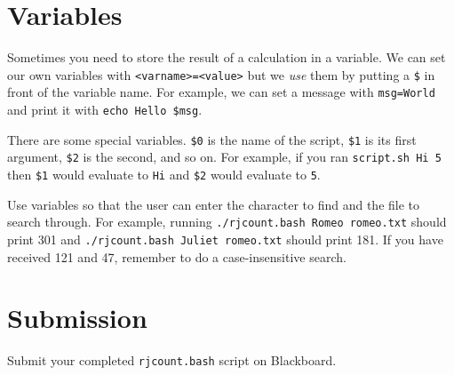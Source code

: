\documentclass[12pt]{article}
\newcommand{\code}[1]{\texttt{#1}}
\newcommand{\filename}{\code{rjcount.bash}\xspace}
\begin{document}
\section*{Variables}

Sometimes you need to store the result of a calculation in a variable.
We can set our own variables with \code{<varname>=<value>} but we \emph{use} them by putting a \code{\$} in front of the variable name.
For example, we can set a message with \code{msg=World} and print it with \code{echo Hello \$msg}.

There are some special variables.
\code{\$0} is the name of the script, \code{\$1} is its first argument, \code{\$2} is the second, and so on.
For example, if you ran \code{script.sh Hi 5} then \code{\$1} would evaluate to \code{Hi} and \code{\$2} would evaluate to \code{5}.

Use variables so that the user can enter the character to find and the file to search through.
For example, running \code{./\filename Romeo romeo.txt} should print 301 and \code{./\filename Juliet romeo.txt} should print 181.
If you have received 121 and 47, remember to do a case-insensitive search.

\section*{Submission}

Submit your completed \filename script on Blackboard.
\end{document}
